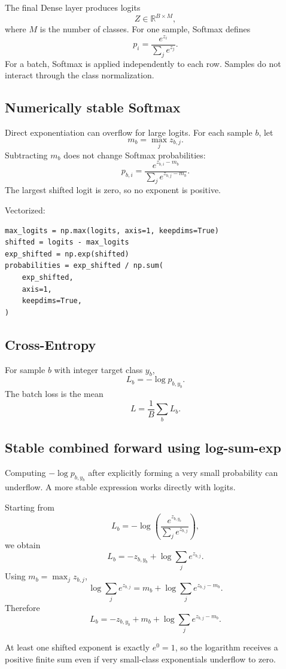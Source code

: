 \documentclass[11pt,a4paper]{article}
\newcommand{\R}{\mathbb{R}}
\begin{document}
The final Dense layer produces logits
\[
Z\in\R^{B\times M},
\]
where $M$ is the number of classes. For one sample, Softmax defines
\[
p_i=\frac{e^{z_i}}{\sum_j e^{z_j}}.
\]
For a batch, Softmax is applied independently to each row. Samples do not interact through the class normalization.

\subsection{Numerically stable Softmax}

Direct exponentiation can overflow for large logits. For each sample $b$, let
\[
m_b=\max_j z_{b,j}.
\]
Subtracting $m_b$ does not change Softmax probabilities:
\[
p_{b,i}
=
\frac{e^{z_{b,i}-m_b}}
{\sum_j e^{z_{b,j}-m_b}}.
\]
The largest shifted logit is zero, so no exponent is positive.

Vectorized:
\begin{lstlisting}
max_logits = np.max(logits, axis=1, keepdims=True)
shifted = logits - max_logits
exp_shifted = np.exp(shifted)
probabilities = exp_shifted / np.sum(
    exp_shifted,
    axis=1,
    keepdims=True,
)
\end{lstlisting}

\subsection{Cross-Entropy}

For sample $b$ with integer target class $y_b$,
\[
L_b=-\log p_{b,y_b}.
\]
The batch loss is the mean
\[
\boxed{
L=\frac{1}{B}\sum_b L_b
}.
\]

\subsection{Stable combined forward using log-sum-exp}

Computing $-\log p_{b,y_b}$ after explicitly forming a very small probability can underflow. A more stable expression works directly with logits.

Starting from
\[
L_b=-\log\left(
\frac{e^{z_{b,y_b}}}{\sum_j e^{z_{b,j}}}
\right),
\]
we obtain
\[
L_b=-z_{b,y_b}+\log\sum_j e^{z_{b,j}}.
\]
Using $m_b=\max_j z_{b,j}$,
\[
\log\sum_j e^{z_{b,j}}
=
m_b+\log\sum_j e^{z_{b,j}-m_b}.
\]
Therefore
\[
\boxed{
L_b
=
-z_{b,y_b}
+m_b
+\log\sum_j e^{z_{b,j}-m_b}
}.
\]

At least one shifted exponent is exactly $e^0=1$, so the logarithm receives a positive finite sum even if very small-class exponentials underflow to zero.
\end{document}
